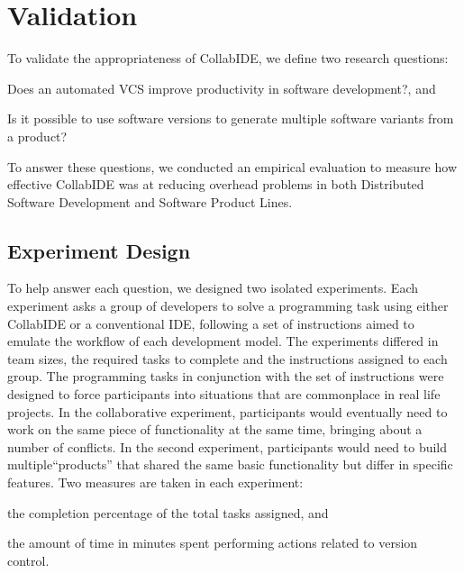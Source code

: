 

\section{Validation}
\label{sec:validation}

To validate the appropriateness of CollabIDE, we define two research questions:
\begin{enumerate*}[label=(\arabic*)]
\item Does an automated \ac{VCS} improve productivity in software development?, and
\item Is it possible to use software versions to generate multiple software variants from a product?
\end{enumerate*} 
To answer these questions, we conducted an empirical evaluation 
to measure how effective CollabIDE was at reducing overhead problems 
in both Distributed Software Development and Software Product Lines.

\subsection{Experiment Design}

To help answer each question, we designed two isolated experiments. Each experiment asks
a group of developers to solve a programming task using either CollabIDE or a 
conventional IDE, following a set of instructions aimed to emulate the workflow of each 
development model. The experiments differed in team sizes, the required tasks to complete and the 
instructions assigned to each group. The programming tasks in conjunction with the set of instructions 
were designed to force participants into situations that are commonplace in real life projects. In the 
collaborative experiment, participants would eventually need to work on the same piece of 
functionality at the same time, bringing about a number of conflicts. In the second experiment, 
participants would need to build multiple``products'' that shared the same basic functionality but differ 
in specific features. Two measures are taken in each experiment:
\begin{enumerate*}[label=(\arabic*)] 
\item the completion percentage of the total tasks assigned, and  
\item the amount of time in minutes spent performing actions related to version control. 
\end{enumerate*}

